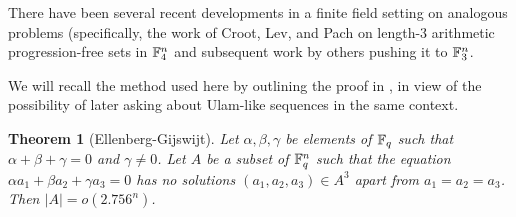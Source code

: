 \documentclass{article}
\newtheorem{theorem}{Theorem}[section]
\theoremstyle{definition}
\theoremstyle{remark}
\numberwithin{equation}{section}
\begin{document}
There have been several recent developments in a finite field setting
on analogous problems (specifically, the work of Croot, Lev, and Pach
\cite{croot:preprint} on length-3 arithmetic progression-free sets
in $\mathbb{F}_4^n$ and subsequent work by others \cite{ellenberg:preprint}
pushing it to $\mathbb{F}_3^n$.

We will recall the method used here by outlining the proof in
\cite{ellenberg:preprint}, in view of the possibility of later asking
about Ulam-like sequences in the same context.

\begin{theorem}[Ellenberg-Gijswijt]
Let $\alpha, \beta, \gamma$ be elements of $\mathbb{F}_q$ such that
$\alpha+\beta+\gamma = 0$ and $\gamma \neq 0$.  Let $A$ be a subset of
$\mathbb{F}_q^n$ such that the equation $\alpha a_1 + \beta a_2 + \gamma a_3
= 0$ has no solutions $(a_1, a_2, a_3) \in A^3$ apart from $a_1 = a_2
= a_3$.  Then $|A| = o(2.756^n)$.
\end{theorem}
\end{document}
